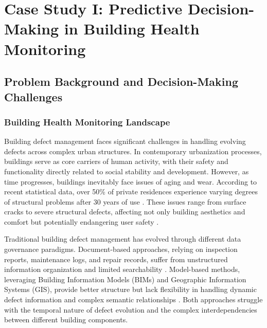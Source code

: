 
\usepackage{multirow}
\usepackage{algorithm}
\usepackage{algorithmic}

\chapter{Case Study I: Predictive Decision-Making in Building Health Monitoring} \label{chp:building}


\section{Problem Background and Decision-Making Challenges}

\subsection{Building Health Monitoring Landscape}

Building defect management faces significant challenges in handling evolving defects across complex urban structures. In contemporary urbanization processes, buildings serve as core carriers of human activity, with their safety and functionality directly related to social stability and development. However, as time progresses, buildings inevitably face issues of aging and wear. According to recent statistical data, over 50\% of private residences experience varying degrees of structural problems after 30 years of use \cite{spencer2019advances}. These issues range from surface cracks to severe structural defects, affecting not only building aesthetics and comfort but potentially endangering user safety \cite{zhang2023automated}.

Traditional building defect management has evolved through different data governance paradigms. Document-based approaches, relying on inspection reports, maintenance logs, and repair records, suffer from unstructured information organization and limited searchability \cite{bruno2018historic}. Model-based methods, leveraging Building Information Models (BIMs) and Geographic Information Systems (GIS), provide better structure but lack flexibility in handling dynamic defect information and complex semantic relationships \cite{li2024single,tsilimantou2020gis}. Both approaches struggle with the temporal nature of defect evolution and the complex interdependencies between different building components.

